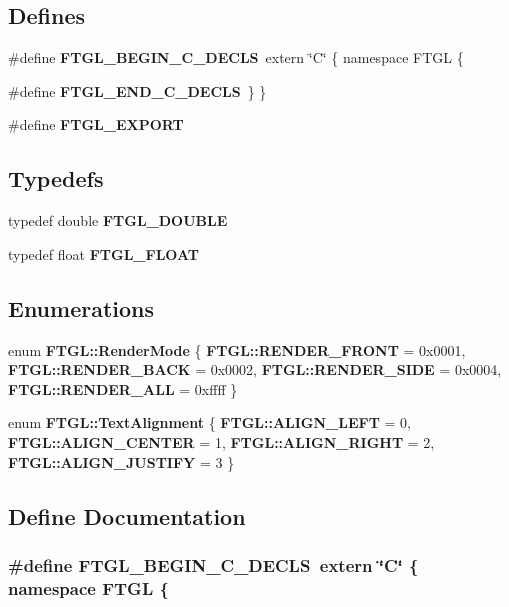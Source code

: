 \subsection*{Defines}
\begin{DoxyCompactItemize}
\item 
\#define {\bf FTGL\_\-BEGIN\_\-C\_\-DECLS}~extern \char`\"{}C\char`\"{} \{ namespace FTGL \{
\item 
\#define {\bf FTGL\_\-END\_\-C\_\-DECLS}~\} \}
\item 
\#define {\bf FTGL\_\-EXPORT}
\end{DoxyCompactItemize}
\subsection*{Typedefs}
\begin{DoxyCompactItemize}
\item 
typedef double {\bf FTGL\_\-DOUBLE}
\item 
typedef float {\bf FTGL\_\-FLOAT}
\end{DoxyCompactItemize}
\subsection*{Enumerations}
\begin{DoxyCompactItemize}
\item 
enum {\bf FTGL::RenderMode} \{ {\bf FTGL::RENDER\_\-FRONT} =  0x0001, 
{\bf FTGL::RENDER\_\-BACK} =  0x0002, 
{\bf FTGL::RENDER\_\-SIDE} =  0x0004, 
{\bf FTGL::RENDER\_\-ALL} =  0xffff
 \}
\item 
enum {\bf FTGL::TextAlignment} \{ {\bf FTGL::ALIGN\_\-LEFT} =  0, 
{\bf FTGL::ALIGN\_\-CENTER} =  1, 
{\bf FTGL::ALIGN\_\-RIGHT} =  2, 
{\bf FTGL::ALIGN\_\-JUSTIFY} =  3
 \}
\end{DoxyCompactItemize}


\subsection{Define Documentation}
\subsubsection[{FTGL\_\-BEGIN\_\-C\_\-DECLS}]{\setlength{\rightskip}{0pt plus 5cm}\#define FTGL\_\-BEGIN\_\-C\_\-DECLS~extern \char`\"{}C\char`\"{} \{ namespace FTGL \{}\label{ftgl_8h_a1543f6485dcd3ef6db0a10396071a6f6}


